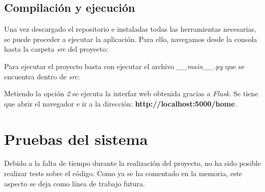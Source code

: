 \subsection{Compilación y ejecución}
Una vez descargado el repositorio e instaladas todas las herramientas necesarias, se puede proceder a ejecutar la aplicación. Para ello, navegamos desde la consola hasta la carpeta \textit{src} del proyecto:


Para ejecutar el proyecto basta con ejecutar el archivo \textit{\_\_main\_\_.py} que se encuentra dentro de \textit{src}:


Metiendo la opción \textit{2} se ejecuta la interfaz web obtenida gracias a \textit{Flask}. Se tiene que abrir el navegador e ir a la dirección: \textbf{http://localhost:5000/home}.


\section{Pruebas del sistema}
Debido a la falta de tiempo durante la realización del proyecto, no ha sido posible realizar tests sobre el código. Como ya se ha comentado en la memoria, este aspecto se deja como línea de trabajo futura.